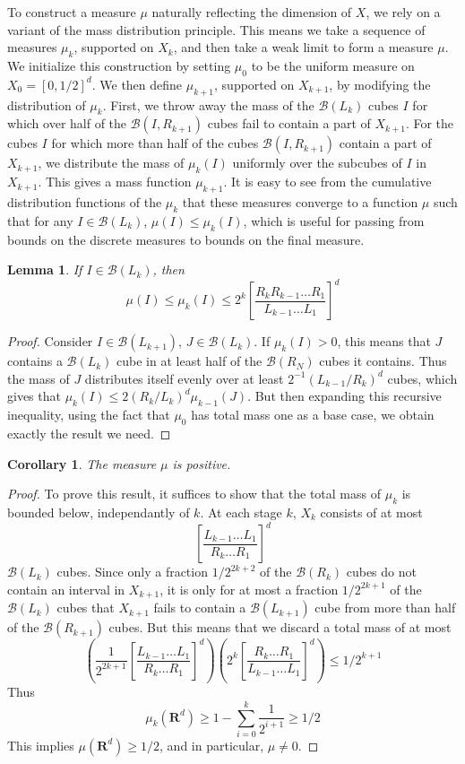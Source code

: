 \documentclass{article}
\theoremstyle{plain}
\newtheorem{lemma}{Lemma}
\newtheorem{corollary}{Corollary}
\theoremstyle{plain}
\begin{document}
To construct a measure $\mu$ naturally reflecting the dimension of $X$, we rely on a variant of the mass distribution principle. This means we take a sequence of measures $\mu_k$, supported on $X_k$, and then take a weak limit to form a measure $\mu$. We initialize this construction by setting $\mu_0$ to be the uniform measure on $X_0 = [0,1/2]^d$. We then define $\mu_{k+1}$, supported on $X_{k+1}$, by modifying the distribution of $\mu_k$. First, we throw away the mass of the $\mathcal{B}(L_k)$ cubes $I$ for which over half of the $\mathcal{B}(I,R_{k+1})$ cubes fail to contain a part of $X_{k+1}$. For the cubes $I$ for which more than half of the cubes $\mathcal{B}(I,R_{k+1})$ contain a part of $X_{k+1}$, we distribute the mass of $\mu_k(I)$ uniformly over the subcubes of $I$ in $X_{k+1}$. This gives a mass function $\mu_{k+1}$. It is easy to see from the cumulative distribution functions of the $\mu_k$ that these measures converge to a function $\mu$ such that for any $I \in \mathcal{B}(L_k)$, $\mu(I) \leq \mu_k(I)$, which is useful for passing from bounds on the discrete measures to bounds on the final measure.

\begin{lemma}
	If $I \in \mathcal{B}(L_k)$, then
	\[ \mu(I) \leq \mu_k(I) \leq 2^k \left[ \frac{R_k R_{k-1} \dots R_1}{L_{k-1} \dots L_1} \right]^d \]
\end{lemma}
\begin{proof}
	Consider $I \in \mathcal{B}(L_{k+1})$, $J \in \mathcal{B}(L_k)$. If $\mu_k(I) > 0$, this means that $J$ contains a $\mathcal{B}(L_k)$ cube in at least half of the $\mathcal{B}(R_N)$ cubes it contains. Thus the mass of $J$ distributes itself evenly over at least $2^{-1} (L_{k-1}/R_k)^d$ cubes, which gives that $\mu_k(I) \leq 2(R_k/L_k)^d \mu_{k-1}(J)$. But then expanding this recursive inequality, using the fact that $\mu_0$ has total mass one as a base case, we obtain exactly the result we need.
\end{proof}

\begin{corollary}
	The measure $\mu$ is positive.
\end{corollary}
\begin{proof}
	To prove this result, it suffices to show that the total mass of $\mu_k$ is bounded below, independantly of $k$. At each stage $k$, $X_k$ consists of at most
	\[ \left[ \frac{L_{k-1} \dots L_1}{R_k \dots R_1} \right]^d \]
	$\mathcal{B}(L_k)$ cubes. Since only a fraction $1/2^{2k+2}$ of the $\mathcal{B}(R_k)$ cubes do not contain an interval in $X_{k+1}$, it is only for at most a fraction $1/2^{2k+1}$ of the $\mathcal{B}(L_k)$ cubes that $X_{k+1}$ fails to contain a $\mathcal{B}(L_{k+1})$ cube from more than half of the $\mathcal{B}(R_{k+1})$ cubes. But this means that we discard a total mass of at most
	\[ \left( \frac{1}{2^{2k + 1}} \left[ \frac{L_{k-1} \dots L_1}{R_k \dots R_1} \right]^d \right) \left( 2^{k} \left[ \frac{R_k \dots R_1}{L_{k-1} \dots L_1} \right]^d \right) \leq 1/2^{k+1} \]
	Thus
	\[ \mu_k(\mathbf{R}^d) \geq 1 - \sum_{i = 0}^k \frac{1}{2^{i+1}} \geq 1/2 \]
	This implies $\mu(\mathbf{R}^d) \geq 1/2$, and in particular, $\mu \neq 0$.
\end{proof}
\end{document}
